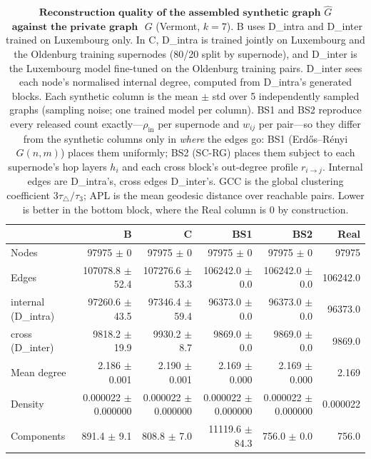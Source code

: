 \begin{table}[H]
\centering
\caption{$\textbf{Reconstruction quality of the assembled synthetic graph}$
$\widehat{G}$ $\textbf{ against the private graph }$ $G$ (Vermont, $k{=}7$).
B uses D\_intra and D\_inter trained on Luxembourg only. In C, D\_intra is trained jointly on Luxembourg and the Oldenburg training supernodes (80/20 split by supernode), and D\_inter is the Luxembourg model fine-tuned on the Oldenburg training pairs. D\_inter sees each node's normalised internal degree, computed from D\_intra's generated blocks. Each synthetic column is the
mean $\pm$ std over 5 independently sampled graphs (sampling noise; one trained
model per column). BS1 and BS2 reproduce every released count exactly---$\rho_{\mathrm{in}}$
per supernode and $w_{ij}$ per pair---so they differ from the synthetic columns
only in \emph{where} the edges go: BS1 (Erd\H{o}s--R\'enyi $G(n,m)$) places them
uniformly; BS2 (SC-RG) places them subject to each supernode's hop layers $h_i$ and
each cross block's out-degree profile $r_{i\to j}$. Internal edges are D\_intra's, cross edges
D\_inter's. GCC is the global clustering coefficient $3\tau_{\triangle}/\tau_{3}$;
APL is the mean geodesic distance over reachable pairs. Lower is better in the
bottom block, where the Real column is $0$ by construction.}
\label{tab:lsyn-vermont-k7}
\begin{tabular}{lrrrrr}
\toprule
 & B & C & BS1 & BS2 & Real \\
\midrule
Nodes                         & 97975 $\pm$ 0 & 97975 $\pm$ 0 & 97975 $\pm$ 0 & 97975 $\pm$ 0 & 97975 \\
Edges                         & 107078.8 $\pm$ 52.4 & 107276.6 $\pm$ 53.3 & 106242.0 $\pm$ 0.0 & 106242.0 $\pm$ 0.0 & 106242.0 \\
\quad internal (D\_intra)     & 97260.6 $\pm$ 43.5 & 97346.4 $\pm$ 59.4 & 96373.0 $\pm$ 0.0 & 96373.0 $\pm$ 0.0 & 96373.0 \\
\quad cross (D\_inter)        & 9818.2 $\pm$ 19.9 & 9930.2 $\pm$ 8.7 & 9869.0 $\pm$ 0.0 & 9869.0 $\pm$ 0.0 & 9869.0 \\
Mean degree                   & 2.186 $\pm$ 0.001 & 2.190 $\pm$ 0.001 & 2.169 $\pm$ 0.000 & 2.169 $\pm$ 0.000 & 2.169 \\
Density                       & 0.000022 $\pm$ 0.000000 & 0.000022 $\pm$ 0.000000 & 0.000022 $\pm$ 0.000000 & 0.000022 $\pm$ 0.000000 & 0.000022 \\
Components                    & 891.4 $\pm$ 9.1 & 808.8 $\pm$ 7.0 & 11119.6 $\pm$ 84.3 & 756.0 $\pm$ 0.0 & 756.0 \\

\end{tabular}
\end{table}
